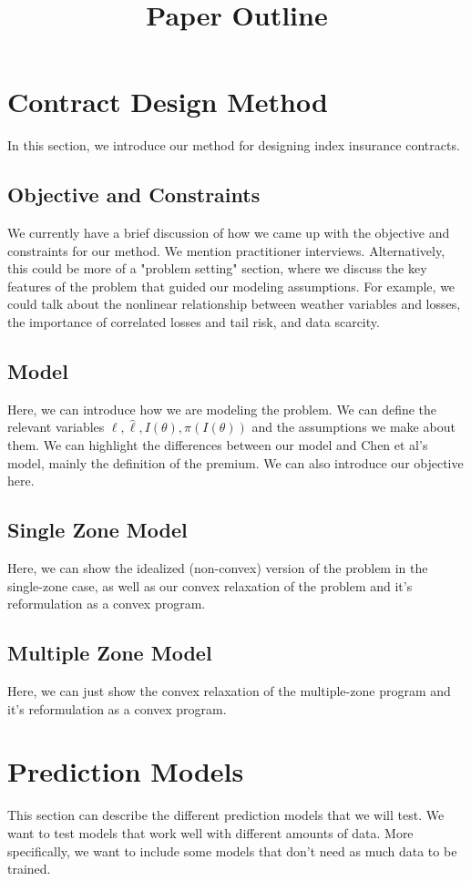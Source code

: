 \documentclass[11pt]{article}
\title{Paper Outline}
\begin{document}
\maketitle

\section{Contract Design Method}
  In this section, we introduce our method for designing index insurance contracts. 
  \subsection{Objective and Constraints}
    We currently have a brief discussion of how we came up with the objective and constraints for our method. We mention practitioner interviews. Alternatively, this could be more of a "problem setting" section, where we discuss the key features of the problem that guided our modeling assumptions. For example, we could talk about the nonlinear relationship between weather variables and losses, the importance of correlated losses and tail risk, and data scarcity. 
  \subsection{Model}
    Here, we can introduce how we are modeling the problem. We can define the relevant variables $\ell, \hat{\ell}, I(\theta), \pi(I(\theta))$ and the assumptions we make about them. We can highlight the differences between our model and Chen et al's model, mainly the definition of the premium. We can also introduce our objective here.
  \subsection{Single Zone Model}
    Here, we can show the idealized (non-convex) version of the problem in the single-zone case, as well as our convex relaxation of the problem and it's reformulation as a convex program.
  \subsection{Multiple Zone Model}
    Here, we can just show the convex relaxation of the multiple-zone program and it's reformulation as a convex program. 

\section{Prediction Models}
  This section can describe the different prediction models that we will test. We want to test models that work well with different amounts of data. More specifically, we want to include some models that don't need as much data to be trained.  
\end{document}
